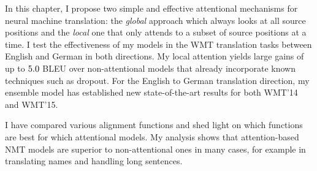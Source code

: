 In this chapter, I propose two simple and effective attentional mechanisms for
neural machine translation: the {\it global} approach which always looks at all
source positions and the {\it local} one that only attends to a subset of source
positions at a time. I test the effectiveness of my models in the WMT
translation tasks between English and German in both directions. 
My local attention yields large gains of up to
$5.0{}$ BLEU over non-attentional models that already incorporate known
techniques such as dropout. For the English to German translation direction, my
ensemble model has established new state-of-the-art
results for both WMT'14 and WMT'15.

I have compared various alignment functions and shed light on which functions
are best for which attentional models.
My analysis shows that attention-based NMT models are superior to
non-attentional ones in many cases, for example in translating names and
handling long
sentences.
